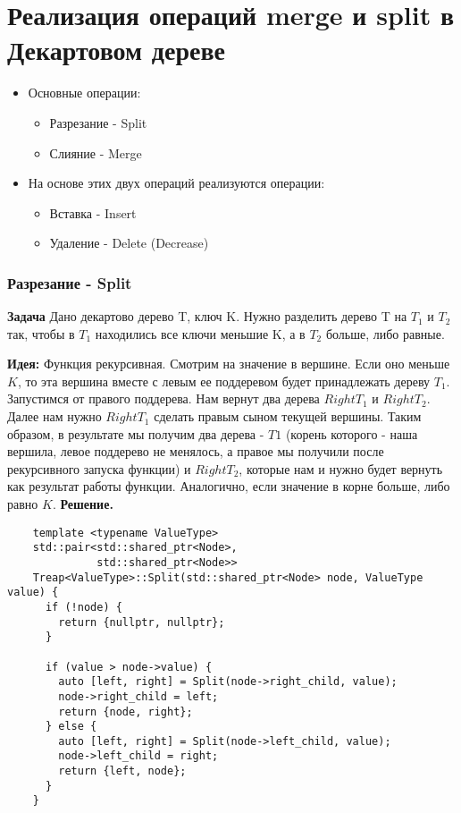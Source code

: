 \section{Реализация операций merge и split в Декартовом дереве}

\begin{itemize}
    \item Основные операции: 
    \begin{itemize}
        \item Разрезание - Split
        \item Слияние - Merge
    \end{itemize}
    \item На основе этих двух операций реализуются операции:
    \begin{itemize}
        \item Вставка - Insert
        \item Удаление - Delete (Decrease)
    \end{itemize}
\end{itemize}

\subsubsection*{Разрезание - Split}

\textbf{Задача} Дано декартово дерево T, ключ K. Нужно разделить дерево T на $T_1$ и $T_2$ так, чтобы в $T_1$ находились все ключи меньшие K, а в $T_2$ больше, либо равные.
\newline

\textbf{Идея:}
Функция рекурсивная. Смотрим на значение в вершине. Если оно меньше $K$, то эта вершина вместе с левым ее поддеревом будет принадлежать дереву $T_1$. Запустимся от правого поддерева. Нам вернут два дерева $RightT_1$ и $RightT_2$. Далее нам нужно $RightT_1$ сделать правым сыном текущей вершины. Таким образом, в результате мы получим два дерева - $T1$ (корень которого - наша вершила, левое поддерево не менялось, а правое мы получили после рекурсивного запуска функции) и $RightT_2$, которые нам и нужно будет вернуть как результат работы функции. Аналогично, если значение в корне больше, либо равно $K$.
\newline
\textbf{Решение.}

\begin{lstlisting}
    template <typename ValueType>
    std::pair<std::shared_ptr<Node>,
              std::shared_ptr<Node>>
    Treap<ValueType>::Split(std::shared_ptr<Node> node, ValueType value) {
      if (!node) {
        return {nullptr, nullptr};
      }
    
      if (value > node->value) {
        auto [left, right] = Split(node->right_child, value);
        node->right_child = left;
        return {node, right};
      } else {
        auto [left, right] = Split(node->left_child, value);
        node->left_child = right;
        return {left, node};
      }
    }
\end{lstlisting}

